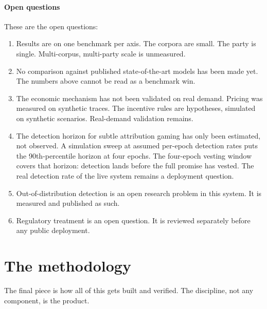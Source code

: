 \documentclass[11pt]{article}
\begin{document}
\paragraph{Open questions}

These are the open questions:

\begin{enumerate}
    \item Results are on one benchmark per axis. The corpora are
          small. The party is single. Multi-corpus, multi-party scale is
          unmeasured.
    \item No comparison against published state-of-the-art models has
          been made yet. The numbers above cannot be read as a benchmark
          win.
    \item The economic mechanism has not been validated on real
          demand. Pricing was measured on synthetic traces. The incentive
          rules are hypotheses, simulated on synthetic scenarios.
          Real-demand validation remains.
    \item The detection horizon for subtle attribution gaming has
          only been estimated, not observed. A simulation sweep at assumed
          per-epoch detection rates puts the 90th-percentile horizon at
          four epochs. The four-epoch vesting window covers that horizon:
          detection lands before the full promise has vested. The real
          detection rate of the live system remains a deployment question.
    \item Out-of-distribution detection is an open research problem
          in this system. It is measured and published as such.
    \item Regulatory treatment is an open question. It is reviewed
          separately before any public deployment.
\end{enumerate}

\section{The methodology}\label{sec:methodology}

The final piece is how all of this gets built and verified. The
discipline, not any component, is the product.
\end{document}
